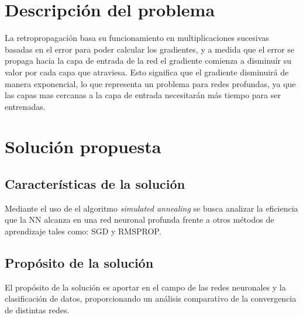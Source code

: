 

\section{Descripción del problema}
La retropropagación basa su funcionamiento en multiplicaciones sucesivas basadas en el error para poder calcular los gradientes, y a medida que el error se propaga hacia la capa de entrada de la red el gradiente comienza a disminuír su valor por cada capa que atraviesa. Esto significa que el gradiente disminuirá de manera exponencial, lo que representa un problema para redes profundas, ya que las capas mas cercanas a la capa de entrada necesitarán más tiempo para ser entrenadas.

\section{Solución propuesta}
\subsection{Características de la solución}
Mediante el uso de el algoritmo {\em simulated annealing} se busca analizar la eficiencia que la NN alcanza en una red neuronal profunda frente a otros métodos de aprendizaje tales como: SGD y RMSPROP.

\subsection{Propósito de la solución}
El propósito de la solución es aportar en el campo de las redes neuronales y la clasificación de datos, proporcionando un análisis comparativo de la convergencia de distintas redes.

